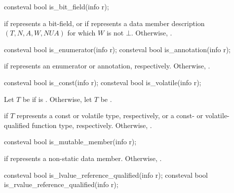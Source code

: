 %
\begin{itemdecl}
consteval bool is_bit_field(info r);
\end{itemdecl}

\begin{itemdescr}
\pnum
\returns
{} if  represents a bit-field,
or if  represents a data member description
$(T, N, A, W, \mathit{NUA})$
for which $W$ is not $\bot$.
Otherwise, .
\end{itemdescr}

%
%
\begin{itemdecl}
consteval bool is_enumerator(info r);
consteval bool is_annotation(info r);
\end{itemdecl}

\begin{itemdescr}
\pnum
\returns
{} if  represents an enumerator or annotation, respectively.
Otherwise, .
\end{itemdescr}

%
%
\begin{itemdecl}
consteval bool is_const(info r);
consteval bool is_volatile(info r);
\end{itemdecl}

\begin{itemdescr}
\pnum
Let $T$ be  if  is .
Otherwise, let $T$ be .

\pnum
\returns
{} if $T$ represents a const or volatile type, respectively,
or a const- or volatile-qualified function type, respectively.
Otherwise, .
\end{itemdescr}

%
\begin{itemdecl}
consteval bool is_mutable_member(info r);
\end{itemdecl}

\begin{itemdescr}
\pnum
\returns
{} if  represents a  non-static data member.
Otherwise, .
\end{itemdescr}

%
%
\begin{itemdecl}
consteval bool is_lvalue_reference_qualified(info r);
consteval bool is_rvalue_reference_qualified(info r);
\end{itemdecl}

